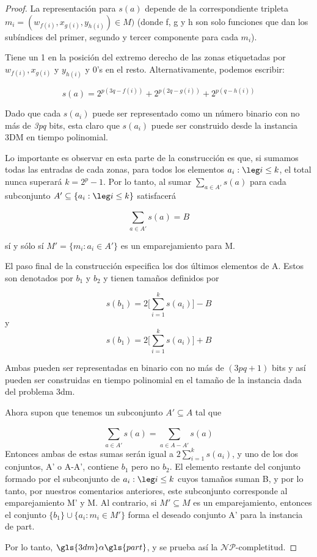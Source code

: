 \documentclass[11pt, a4paper]{memoir}
\begin{document}
\begin{proof}
La representación para $s(a)$ depende de la correspondiente tripleta $m_i = (w_{f(i)}, x_{g(i)}, y_{h(i)} )\in M)$ (donde f, g y h son solo funciones que dan los subíndices del primer, segundo y tercer componente para cada $m_i$). \par 
Tiene un 1 en la posición del extremo derecho de las zonas etiquetadas por $w_{f(i)}, x_{g(i)}$ y $y_{h(i)}$ y 0's en el resto. Alternativamente, podemos escribir: \par 

\[s(a) = 2^{p(3q-f(i))} + 2^{p(2q-g(i))} + 2^{p(q-h(i))}\]

Dado que cada $s(a_i)$ puede ser representado como un número binario con no más de \textit{3pq} bits, esta claro que $s(a_i)$ puede ser construido desde la instancia 3DM en tiempo polinomial. \par 

Lo importante es observar en esta parte de la construcción es que, si sumamos todas las entradas de cada zonas, para todos los elementos \({a_i:\leg i\leq k}\), el total nunca superará \(k=2^p-1\). Por lo tanto, al sumar \(\sum_{a \in A'}^{} s(a)\) para cada subconjunto \(A'\subseteq\{a_i:\leg i\leq k\}\) satisfacerá

\[\sum_{a \in A'}^{} s(a) = B\]

sí y sólo sí \(M'= \{m_i:a_i\in A'\}\) es un emparejamiento para M. \par 
El paso final de la construcción especifica los dos últimos elementos de A. Estos son denotados por $b_1$ y $b_2$ y tienen tamaños definidos por

\[s(b_1) = 2 \Big[\sum_{i=1}^{k} s(a_i)\Big] - B\]
y
\[s(b_1) = 2 \Big[\sum_{i=1}^{k} s(a_i)\Big] + B\]
\newpage

Ambas pueden ser representadas en binario con no más de \((3pq+1)\) bits y así pueden ser construidas en tiempo polinomial en el tamaño de la instancia dada del problema \gls{3dm}. \par 

Ahora supon que tenemos un subconjunto \(A'\subseteq A\) tal que

\[\sum_{a \in A'}^{} s(a) = \sum_{a \in A-A'}^{} s(a)\]
Entonces ambas de estas sumas serán igual a \(2\sum_{i=1}^{k} s(a_i)\), y uno de los dos conjuntos, A' o A-A', contiene $b_1$ pero no $b_2$. El elemento restante del conjunto formado por el subconjunto de \({a_i:\leg i\leq k}\) cuyos tamaños suman B, y por lo tanto, por nuestros comentarios anteriores, este subconjunto corresponde al emparejamiento M' y M. Al contrario, si \(M'\subseteq M\) es un emparejamiento, entonces el conjunto \(\{b_1\} \cup \{a_i:m_i\in M'\}\) forma el deseado conjunto A' para la instancia de \gls{part}. \par

Por lo tanto, \(\gls{3dm} \alpha \gls{part}\), y se prueba así la $\mathcal{NP}$-completitud.

\end{proof}

\printglossary[type=\acronymtype]
\end{document}
